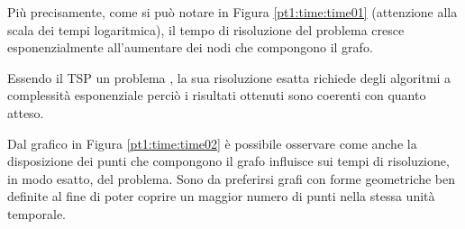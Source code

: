 Più precisamente, come si può notare in Figura \ref{pt1:time:time01} (attenzione alla scala dei tempi logaritmica), il tempo di risoluzione del problema cresce esponenzialmente all'aumentare dei nodi che compongono il grafo.

Essendo il TSP un problema , la sua risoluzione esatta richiede degli algoritmi a complessità esponenziale perciò i risultati ottenuti sono coerenti con quanto atteso.

Dal grafico in Figura \ref{pt1:time:time02} è possibile osservare come anche la disposizione dei punti che compongono il grafo influisce sui tempi di risoluzione, in modo esatto, del problema. Sono da preferirsi grafi con forme geometriche ben definite al fine di poter coprire un maggior numero di punti nella stessa unità temporale.